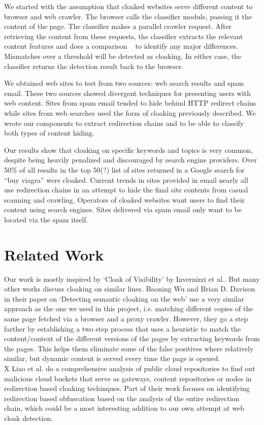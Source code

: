 \documentclass[letterpaper,twocolumn,10pt]{article}
\begin{document}
We started with the assumption that cloaked websites serve different content to browser and web crawler.  The browser calls the classifier module, passing it the content of the page.  The classifier makes a parallel crawler request. After retrieving the content from these requests, the classifier extracts the relevant content features and does a comparison ~\cite{cloak} to identify any major differences.  Mismatches over a threshold will be detected as cloaking.  In either case, the classifier returns the detection result back to the browser.

We obtained web sites to test from two sources: web search results and spam email.  These two sources showed divergent techniques for presenting users with web content.  Sites from spam email tended to hide behind HTTP redirect chains while sites from web searches used the form of cloaking previously described.  We wrote our components to extract redirection chains and to be able to classify both types of content hiding.

Our results show that cloaking on specific keywords and topics is very common, despite being heavily penalized and discouraged by search engine providers. Over 50\% of all results in the top 50(?) list of sites returned in a Google search for ``buy viagra'' were cloaked. Current trends in sites provided in email nearly all use redirection chains in an attempt to hide the final site contents from casual scanning and crawling.  Operators of cloaked websites want users to find their content using search engines.  Sites delivered via spam email only want to be located via the spam itself.

\section{Related Work}
Our work is mostly inspired by `Cloak of Visibility' by Invernizzi et al.\cite{cloak}. But many other works discuss cloaking on similar lines. Baoning Wu and Brian D. Davison in their paper on `Detecting semantic cloaking on the web'\cite{Wu:2006:DSC:1135777.1135901} use a very similar approach as the one we used in this project, i.e. matching different copies of the same page fetched via a browser and a proxy crawler. However, they go a step farther by establishing a two step process that uses a heuristic to match the content/context of the different versions of the pages by extracting keywords from the pages. This helps them eliminate some of the false positives where relatively similar, but dynamic content is served every time the page is opened.\\
X Liao et al.\cite{liao2016lurking} do a comprehensive analysis of public cloud repositories to find out malicious cloud buckets that serve as gateways, content repositories or nodes in redirection based cloaking techinques. Part of their work focuses on identifying redirection based obfuscation based on the analysis of the entire redirection chain, which could be a most interesting addition to our own attempt at web cloak detection.
\end{document}
